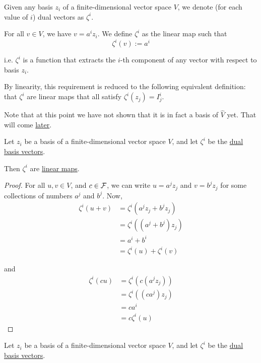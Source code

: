 \label{b5a6327}

\cvn Given any basis $z_i$ of a finite-dimensional vector space $V$, we denote
(for each value of $i$) dual vectors as $\zeta^i$.

For all $v\in V$, we have $v=a^iz_i$. We define $\zeta^i$ as the linear map
such that
$$
  \zeta^i(v):=a^i
$$

i.e. $\zeta^i$ is a function that extracts the $i$-th component of any vector
with respect to basis $z_i$.

By linearity, this requirement is reduced to the following equivalent
definition: that $\zeta^i$ are linear maps that all satisfy
$\zeta^i(z_j)=I^i_j$.

Note that at this point we have not shown that it is in fact a basis of $\hat
V$ yet. That will come \href{b527a74}{later}.

\label{a484f61}

\cvn Let $z_i$ be a basis of a finite-dimensional vector space $V$, and let
$\zeta^i$ be the \href{b5a6327}{dual basis vectors}.

Then $\zeta^i$ are \href{d7d1925}{linear maps}.

\begin{proof}
  For all $u,v\in V$, and $c\in\mathcal F$, we can write $u=a^jz_j$ and $v=b^jz_j$ for
  some collections of numbers $a^j$ and $b^j$. Now,
  \begin{align*}
    \zeta^i(u+v) &=\zeta^i(a^jz_j+b^jz_j) \\
                 &=\zeta^i((a^j+b^j)z_j)  \\
                 &=a^i+b^i                \\
                 &=\zeta^i(u)+\zeta^i(v)
  \end{align*}

  and
  \begin{align*}
    \zeta^i(cu) &=\zeta^i(c(a^jz_j)) \\
                &=\zeta^i((ca^j)z_j) \\
                &=ca^i               \\
                &=c\zeta^i(u)
  \end{align*}
\end{proof}

\label{c0b06bb}

\cvn Let $z_i$ be a basis of a finite-dimensional vector space $V$, and let
$\zeta^i$ be the \href{b5a6327}{dual basis vectors}.

